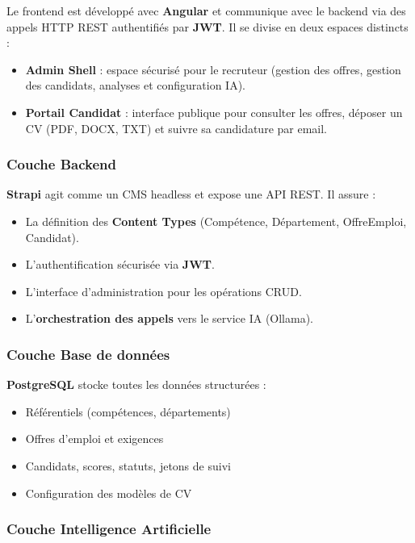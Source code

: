 \documentclass[12pt,a4paper,oneside]{report}
\begin{document}
\begin{itemize}
Le frontend est développé avec \textbf{Angular} et communique avec le backend via des appels HTTP REST authentifiés par \textbf{JWT}. Il se divise en deux espaces distincts :

\begin{itemize}
    \item \textbf{Admin Shell} : espace sécurisé pour le recruteur (gestion des offres, gestion des candidats, analyses et configuration IA).
    \item \textbf{Portail Candidat} : interface publique pour consulter les offres, déposer un CV (PDF, DOCX, TXT) et suivre sa candidature par email.
\end{itemize}

\subsubsection{Couche Backend}

\textbf{Strapi} agit comme un CMS headless et expose une API REST. Il assure :

\begin{itemize}
    \item La définition des \textbf{Content Types} (Compétence, Département, OffreEmploi, Candidat).
    \item L'authentification sécurisée via \textbf{JWT}.
    \item L'interface d'administration  pour les opérations CRUD.
    \item L'\textbf{orchestration des appels} vers le service IA (Ollama).
\end{itemize}

\subsubsection{Couche Base de données}

\textbf{PostgreSQL} stocke toutes les données structurées  :

\begin{itemize}
    \item Référentiels (compétences, départements)
    \item Offres d'emploi et exigences
    \item Candidats, scores, statuts, jetons de suivi
    \item Configuration des modèles de CV
\end{itemize}

\subsubsection{Couche Intelligence Artificielle }


\end{itemize}
\end{document}

